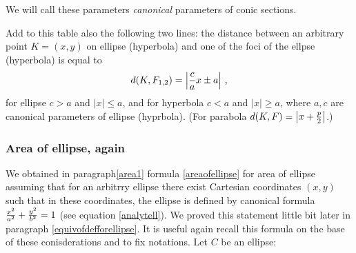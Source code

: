 \documentclass[12pt]{article}
\numberwithin{equation}{section}
\begin{document}
We will call these parameters {\it canonical} parameters
of conic sections.

\m

{\footnotesize    Add to this table also 
the following two lines:  the distance between an arbitrary 
point $K=(x,y)$ on ellipse (hyperbola)
 and one of the foci of the ellpse (hyperbola)  is equal to  
       \begin{equation*}
    d(K,F_{1,2})=\left|{c\over a}x\pm a\right|\,,
         \end{equation*}
for ellipse $c>a$ and $|x|\leq a$, and for hyperbola
    $c<a$ and  $|x|\geq a$, where
$a,c$ are canonical parameters of ellipse (hyprbola).
(For parabola $d(K,F)=\left|x+{p\over 2}\right|$.) 




}

\subsubsection {Area of ellipse, again}

We obtained in paragraph\ref{area1} formula 
\eqref{areaofellipse}
for area of ellipse assuming that for an arbitrry ellipse there 
exist Cartesian coordinates $(x,y)$
such that in these coordinates, the ellipse is defined
by canonical formula ${x^2\over a^2}+{y^2\over b^2}=1$ 
(see equation \eqref{analytell}).
 We proved this statement little bit later in
paragraph \ref{equivofdefforellipse}.
  It is useful again recall this formula
on the base of these conisderations and to fix
notations.  Let
$C$ be an ellipse:
\end{document}
